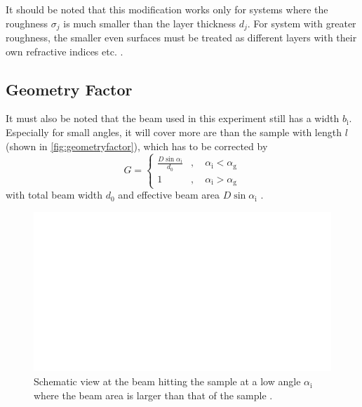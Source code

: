 It should be noted that this modification works only for systems where the roughness $\sigma_j$ is much smaller than the layer thickness $d_j$.
For system with greater roughness, the smaller even surfaces must be treated as different layers with their own refractive indices etc. \cite{tolan}.

\subsection{Geometry Factor}

It must also be noted that the beam used in this experiment still has a width $b_\text{i}$.
Especially for small angles, it will cover more are than the sample with length $l$ (shown in \autoref{fig:geometryfactor}), 
which has to be corrected by
\begin{equation}
    G = \begin{cases}
        \frac{D \sin\alpha_\text{i}}{d_0}&, \quad \alpha_ \text{i} < \alpha_\text{g} \\
        1&,\quad \alpha_\text{i} > \alpha_\text{g}
    \end{cases}
    \label{eq:GeometryFactor}
\end{equation}
with total beam width $d_0$ and effective beam area $D \sin\alpha_\text{i}$ \cite{v44}.

\begin{figure}[H]
    \centering
    \includegraphics{figures/beam_width.pdf}
    \caption{Schematic view at the beam hitting the sample at a low angle $\alpha_\text{i}$ where the beam area is larger than that of the sample \cite{v44}.}
    \label{fig:geometryfactor}
\end{figure}




